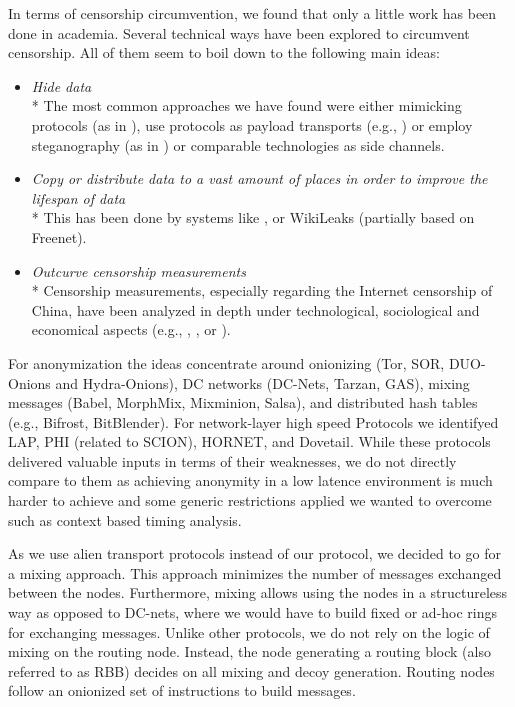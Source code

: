 \documentclass[acmsmall, screen, final, natbib=false]{acmart}
\begin{document}
	In terms of censorship circumvention, we found that only a little work has been done in academia. Several technical ways have been explored to circumvent censorship. All of them seem to boil down to the following main ideas:
	\begin{itemize}
		\item \emph{Hide data}\\*
		The most common approaches we have found were either mimicking protocols (as in \cite{mohajeri2013skypemorph}), use protocols as payload transports (e.g., \cite{AthanRAM07}) or employ steganography (as in \cite{f5}) or comparable technologies as side channels.
		\item \emph{Copy or distribute data to a vast amount of places in order to improve the lifespan of data}\\*
		This has been done by systems like \cite{freenet}, or WikiLeaks (partially based on Freenet).
		\item \emph{Outcurve censorship measurements}\\*
		Censorship measurements, especially regarding the Internet censorship of China, have been analyzed in depth under technological, sociological and economical aspects (e.g., \cite{Ensafi:2015}, \cite{Clayton:2006}, or \cite{lowe2007great}).
	\end{itemize}
	
	For anonymization the ideas concentrate around onionizing (Tor\cite{tor-spec}, SOR\cite{Egners_2012}, DUO-Onions and Hydra-Onions\cite{iwanik2005duo}), DC networks (DC-Nets\cite{chaum-dc}, Tarzan\cite{tarzan:ccs02}, GAS\cite{AthanRAM07}), mixing messages (Ba\-bel\cite{babel}, Morph\-Mix\cite{morphmix:wpes2002}, Mixminion\cite{minion-design}, Salsa\cite{Salsa}), and distributed hash tables (e.g., Bi\-frost\cite{Kondo2009}, Bit\-Blen\-der\cite{Bauer:2008}). For network-layer high speed Protocols we identifyed LAP\cite{hsiao2012lap}, PHI (related to SCI\-ON\cite{perrig2017scion}), HOR\-NET\cite{chen2015hornet}, and Dovetail\cite{chen2015hornet}. While these protocols delivered valuable inputs in terms of their weaknesses, we do not directly compare to them as achieving anonymity in a low latence environment is much harder to achieve and some generic restrictions applied we wanted to overcome such as context based timing analysis.
	
	As we use alien transport protocols instead of our protocol, we decided to go for a mixing approach. This approach minimizes the number of messages exchanged between the nodes. Furthermore, mixing allows using the nodes in a structureless way as opposed to DC-nets, where we would have to build fixed or ad-hoc rings for exchanging messages. Unlike other protocols, we do not rely on the logic of mixing on the routing node. Instead, the node generating a routing block (also referred to as RBB) decides on all mixing and decoy generation. Routing nodes follow an onionized set of instructions to build messages. 
	
\end{document}
